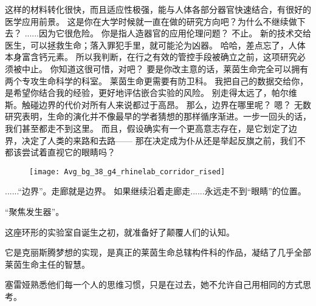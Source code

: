 \documentclass[openany]{book}
\begin{document}
\begin{dialogue}
     这样的材料转化很快，而且适应性极强，能与人体各部分器官快速结合，有很好的医学应用前景。
     这是你在大学时候就一直在做的研究方向吧？为什么不继续做下去？
     ......因为它很危险。
     你是指人造器官的应用伦理问题？
     不止。
     新的技术交给医生，可以拯救生命；落入罪犯手里，就可能沦为凶器。
     哈哈，差点忘了，人体本身富含钙元素。
     所以我判断，在行之有效的管控手段被确立之前，这项研究必须被中止。
     你知道这很可惜，对吧？
     要是你改主意的话，莱茵生命完全可以拥有两个专攻生命科学的科室。
     莱茵生命更需要有防卫科。
     我把自己的数据交给你，是希望你结合我的经验，更好地评估嵌合实验的风险。
     别走得太远了，帕尔维斯。触碰边界的代价对所有人来说都过于高昂。
     那么，边界在哪里呢？
     嗯？
     无数研究表明，生命的演化并不像最早的学者猜想的那样循序渐进。一步一回头的话，我们甚至都走不到这里。
     而且，假设确实有一个更高意志存在，是它划定了边界，决定了人类的来路和去路——
     那在决定成为仆从还是举起反旗之前，我们不都该尝试着直视它的眼睛吗？
    \begin{figure}[h]
        \centering
        \texttt{[image: Avg\_bg\_38\_g4\_rhinelab\_corridor\_rised]}
    \end{figure}
     ......“边界”。走廊就是边界。
     如果继续沿着走廊走......永远走不到“眼睛”的位置。
\end{dialogue}\par

“聚焦发生器”。\par
这座环形的实验室自诞生之初，就准备好了颠覆人们的认知。\par
它是克丽斯腾梦想的实现，是真正的莱茵生命总辖构件科的作品，凝结了几乎全部莱茵生命主任的智慧。\par
塞雷娅熟悉他们每一个人的思维习惯，只是在过去，她不允许自己用相同的方式思考。
\end{document}
